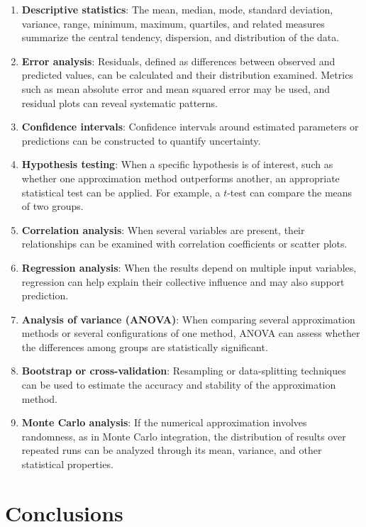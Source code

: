 \documentclass[a4paper]{article}
\begin{document}
\begin{enumerate}
  \item \textbf{Descriptive statistics}: The mean, median, mode, standard deviation, variance, range, minimum, maximum, quartiles, and related measures summarize the central tendency, dispersion, and distribution of the data.
  \item \textbf{Error analysis}: Residuals, defined as differences between observed and predicted values, can be calculated and their distribution examined. Metrics such as mean absolute error and mean squared error may be used, and residual plots can reveal systematic patterns.
  \item \textbf{Confidence intervals}: Confidence intervals around estimated parameters or predictions can be constructed to quantify uncertainty.
  \item \textbf{Hypothesis testing}: When a specific hypothesis is of interest, such as whether one approximation method outperforms another, an appropriate statistical test can be applied. For example, a $t$-test can compare the means of two groups.
  \item \textbf{Correlation analysis}: When several variables are present, their relationships can be examined with correlation coefficients or scatter plots.
  \item \textbf{Regression analysis}: When the results depend on multiple input variables, regression can help explain their collective influence and may also support prediction.
  \item \textbf{Analysis of variance (ANOVA)}: When comparing several approximation methods or several configurations of one method, ANOVA can assess whether the differences among groups are statistically significant.
  \item \textbf{Bootstrap or cross-validation}: Resampling or data-splitting techniques can be used to estimate the accuracy and stability of the approximation method.
  \item \textbf{Monte Carlo analysis}: If the numerical approximation involves randomness, as in Monte Carlo integration, the distribution of results over repeated runs can be analyzed through its mean, variance, and other statistical properties.
\end{enumerate}

\section{Conclusions}
\end{document}
